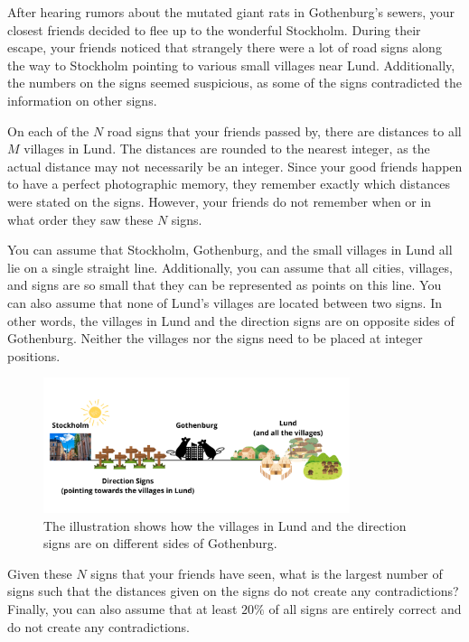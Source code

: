 \noindent
After hearing rumors about the mutated giant rats in Gothenburg's sewers, your closest friends decided to flee up to the wonderful Stockholm. 
During their escape, your friends noticed that strangely there were a lot of road signs along the way to Stockholm pointing 
to various small villages near Lund. Additionally, the numbers on the signs seemed suspicious, as some of the signs contradicted the information on other signs.

On each of the $N$ road signs that your friends passed by, there are distances to all $M$ villages in Lund. 
The distances are rounded to the nearest integer, as the actual distance may not necessarily be an integer. 
Since your good friends happen to have a perfect photographic memory, they remember exactly which distances were stated on the signs. 
However, your friends do not remember when or in what order they saw these $N$ signs.

You can assume that Stockholm, Gothenburg, and the small villages in Lund all lie on a single straight line. 
Additionally, you can assume that all cities, villages, and signs are so small that they can be represented as 
points on this line. You can also assume that none of Lund's villages are located between two signs. 
In other words, the villages in Lund and the direction signs are on opposite sides of Gothenburg. 
Neither the villages nor the signs need to be placed at integer positions.

\begin{centering}
  \begin{figure}[h]
      \centering
      \includegraphics[width=0.8\textwidth]{skyltar.png}
      \caption{The illustration shows how the villages in Lund and the direction signs are on different sides of Gothenburg.}
  \end{figure}
\end{centering}

Given these $N$ signs that your friends have seen, what is the largest number of signs such that the distances given on the signs do not create any contradictions? 
Finally, you can also assume that at least $20\%$ of all signs are entirely correct and do not create any contradictions.


